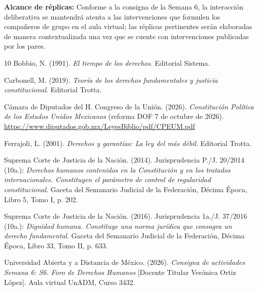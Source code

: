 \documentclass[spanish,letterpaper,oneside]{article}
\begin{document}
\textbf{Alcance de réplicas:} Conforme a la consigna de la Semana 6, la interacción deliberativa se mantendrá atenta a las intervenciones que formulen los compañeros de grupo en el aula virtual; las réplicas pertinentes serán elaboradas de manera contextualizada una vez que se cuente con intervenciones publicadas por los pares.
\hypertarget{cuerpo-fin}{}

\vspace{10pt}
\begingroup\fontsize{10}{11.5}\selectfont
\setlength{\bibsep}{4pt}
\begin{thebibliography}{10}
Bobbio, N. (1991). \emph{El tiempo de los derechos}. Editorial Sistema.

Carbonell, M. (2019). \emph{Teor{\'i}a de los derechos fundamentales y justicia constitucional}. Editorial Trotta.

C{\'a}mara de Diputados del H. Congreso de la Uni{\'o}n. (2026). \emph{Constituci{\'o}n Pol{\'i}tica de los Estados Unidos Mexicanos} (reforma DOF 7 de octubre de 2026). \url{https://www.diputados.gob.mx/LeyesBiblio/pdf/CPEUM.pdf}

Ferrajoli, L. (2001). \emph{Derechos y garant{\'i}as: La ley del m{\'a}s d{\'e}bil}. Editorial Trotta.

Suprema Corte de Justicia de la Naci{\'o}n. (2014). Jurisprudencia P./J. 20/2014 (10a.): \emph{Derechos humanos contenidos en la Constituci{\'o}n y en los tratados internacionales. Constituyen el par{\'a}metro de control de regularidad constitucional}. Gaceta del Semanario Judicial de la Federaci{\'o}n, D{\'e}cima {\'E}poca, Libro 5, Tomo I, p. 202.

Suprema Corte de Justicia de la Naci{\'o}n. (2016). Jurisprudencia 1a./J. 37/2016 (10a.): \emph{Dignidad humana. Constituye una norma jur{\'i}dica que consagra un derecho fundamental}. Gaceta del Semanario Judicial de la Federaci{\'o}n, D{\'e}cima {\'E}poca, Libro 33, Tomo II, p. 633.

Universidad Abierta y a Distancia de M{\'e}xico. (2026). \emph{Consigna de actividades Semana 6: S6. Foro de Derechos Humanos} [Docente Titular Ver{\'o}nica Ortiz L{\'o}pez]. Aula virtual UnADM, Curso 3432.
\end{thebibliography}
\endgroup
\end{document}
